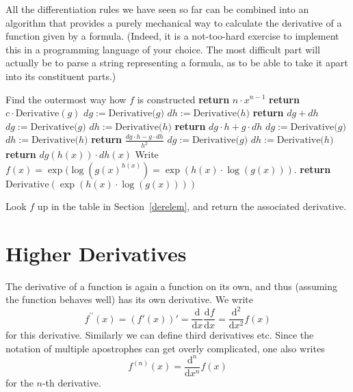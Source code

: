 All the differentiation rules we have seen so far can be combined into an
algorithm that provides a purely mechanical way to calculate the derivative
of a function given by a formula. (Indeed, it is a not-too-hard exercise to
implement this in a programming language of your choice. The most difficult
part will actually be to parse a string representing a formula, as to be able
to take it apart into its constituent parts.)

\begin{algorithmic}[5]
\State Find the outermost way how $f$ is constructed
\State {}
\State \textbf{return} $n\cdot x^{n-1}$
\State \textbf{return} $c\cdot \mbox{Derivative}(g)$
\State
{}
\State $dg:=\mbox{Derivative($g$)}$
\State $dh:=\mbox{Derivative($h$)}$
\State \textbf{return} $dg+dh$ 
\State $dg:=\mbox{Derivative($g$)}$
\State $dh:=\mbox{Derivative($h$)}$
\State \textbf{return} $dg\cdot h+g\cdot dh$
\State $dg:=\mbox{Derivative($g$)}$
\State $dh:=\mbox{Derivative($h$)}$
\State \textbf{return} $\frac{dg\cdot h-g\cdot dh}{h^2}$
\State $dg:=\mbox{Derivative($g$)}$
\State $dh:=\mbox{Derivative($h$)}$
\State \textbf{return} $dg(h(x))\cdot dh(x)$
\State
Write $f(x)=\exp(\log(g(x)^{h(x)})=\exp(h(x)\cdot\log(g(x)))$.
\State \textbf{return} $\mbox{Derivative}(\exp(h(x)\cdot\log(g(x))))$

\Else
  \State Look $f$ up in the table in Section~\ref{derelem}, and return the associated derivative.
\EndIf
\EndProcedure
\end{algorithmic}

\section{Higher Derivatives}

The derivative of a function is again a function on its own, and thus
(assuming the function behaves well) has
its own derivative. We write
\[
f^{\prime\prime}(x)=(f'(x))'
=\frac{\mbox{d}}{\mbox{d}x}\frac{\mbox{d}f}{\mbox{d}x}
=\frac{\mbox{d}^2}{\mbox{d}x^2}f(x)
\]
for this derivative. Similarly we can define third derivatives etc. Since
the notation of multiple apostrophes can get overly complicated, one also writes
\[
f^{(n)}(x)=
\frac{\mbox{d}^n}{\mbox{d}x^n}f(x)
\]
for the $n$-th derivative.

